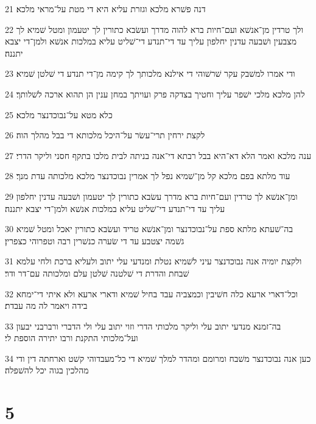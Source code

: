 \par 21 דנה פשׁרא מלכא וגזרת עליא היא די מטת על־מראי מלכא׃
\par 22 ולך טרדין מן־אנשׁא ועם־חיות ברא להוה מדרך ועשׂבא כתורין לך יטעמון ומטל שׁמיא לך מצבעין ושׁבעה עדנין יחלפון עליך עד די־תנדע די־שׁליט עליא במלכות אנשׁא ולמן־די יצבא יתננה׃
\par 23 ודי אמרו למשׁבק עקר שׁרשׁוהי די אילנא מלכותך לך קימה מן־די תנדע די שׁלטן שׁמיא׃
\par 24 להן מלכא מלכי ישׁפר עליך וחטיך בצדקה פרק ועויתך במחן ענין הן תהוא ארכה לשׁלותך׃
\par 25 כלא מטא על־נבוכדנצר מלכא׃
\par 26 לקצת ירחין תרי־עשׂר על־היכל מלכותא די בבל מהלך הוה׃
\par 27 ענה מלכא ואמר הלא דא־היא בבל רבתא די־אנה בניתה לבית מלכו בתקף חסני וליקר הדרי׃
\par 28 עוד מלתא בפם מלכא קל מן־שׁמיא נפל לך אמרין נבוכדנצר מלכא מלכותה עדת מנך׃
\par 29 ומן־אנשׁא לך טרדין ועם־חיות ברא מדרך עשׂבא כתורין לך יטעמון ושׁבעה עדנין יחלפון עליך עד די־תנדע די־שׁליט עליא במלכות אנשׁא ולמן־די יצבא יתננה׃
\par 30 בה־שׁעתא מלתא ספת על־נבוכדנצר ומן־אנשׁא טריד ועשׂבא כתורין יאכל ומטל שׁמיא גשׁמה יצטבע עד די שׂערה כנשׁרין רבה וטפרוהי כצפרין׃
\par 31 ולקצת יומיה אנה נבוכדנצר עיני לשׁמיא נטלת ומנדעי עלי יתוב ולעליא ברכת ולחי עלמא שׁבחת והדרת די שׁלטנה שׁלטן עלם ומלכותה עם־דר ודר׃
\par 32 וכל־דארי ארעא כלה חשׁיבין וכמצביה עבד בחיל שׁמיא ודארי ארעא ולא איתי די־ימחא בידה ויאמר לה מה עבדת׃
\par 33 בה־זמנא מנדעי יתוב עלי וליקר מלכותי הדרי וזוי יתוב עלי ולי הדברי ורברבני יבעון ועל־מלכותי התקנת ורבו יתירה הוספת לי׃
\par 34 כען אנה נבוכדנצר משׁבח ומרומם ומהדר למלך שׁמיא די כל־מעבדוהי קשׁט וארחתה דין ודי מהלכין בגוה יכל להשׁפלה׃

\chapter{5}

